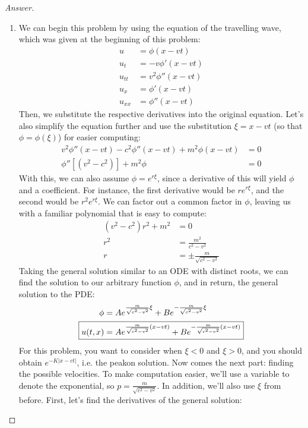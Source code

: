 \documentclass{article}
\theoremstyle{definition}
\renewcommand\qedsymbol{$\blacksquare$}
\newenvironment{ans}{\begin{proof}[Answer]\renewcommand{\qedsymbol}{}}{\end{proof}}
\begin{document}
\begin{ans}
\begin{enumerate}[start=38, resume*=answers]
    \item We can begin this problem by using the equation of the travelling wave, which was given at the beginning of this problem:
    \begin{align*}
        u &= \phi(x-vt)\\
        u_t &= -v\phi'(x-vt)\\
        u_{tt} &= v^2\phi''(x-vt)\\
        u_x &= \phi'(x-vt)\\
        u_{xx} &= \phi''(x-vt)
    \end{align*}
    Then, we substitute the respective derivatives into the original equation. Let's also simplify the equation further and use the substitution $\xi = x-vt$ (so that $\phi = \phi(\xi)$) for easier computing:
    \begin{align*}
        v^2\phi''(x-vt) - c^2\phi''(x-vt) + m^2\phi(x-vt)&=0\\
        \phi''[(v^2 - c^2)] + m^2\phi&=0
    \end{align*}
    With this, we can also assume $\phi = e^{r\xi}$, since a derivative of this will yield $\phi$ and a coefficient. For instance, the first derivative would be $re^{r\xi}$, and the second would be $r^2e^{r\xi}$. We can factor out a common factor in $\phi$, leaving us with a familiar polynomial that is easy to compute:
    \begin{align*}
        (v^2 - c^2)r^2 + m^2 &= 0\\
        r^2 &= \frac{m^2}{c^2 - v^2}\\
        r &= \pm \frac{m}{\sqrt{c^2-v^2}}
    \end{align*}
    Taking the general solution similar to an ODE with distinct roots, we can find the solution to our arbitrary function $\phi$, and in return, the general solution to the PDE:
    \begin{align*}
        \phi &= Ae^{\frac{m}{\sqrt{c^2 - v^2}}\xi} + Be^{-\frac{m}{\sqrt{c^2 - v^2}}\xi}\\
        \Aboxed{u(t,x) &= Ae^{\frac{m}{\sqrt{c^2 - v^2}}(x-vt)} + Be^{-\frac{m}{\sqrt{c^2 - v^2}}(x-vt)}}
    \end{align*}
    {\color{red} For this problem, you want to consider when $\xi<0$ and $\xi>0$, and you should obtain $e^{-K|x-ct|}$, i.e. the peakon solution. }
    Now comes the next part: finding the possible velocities. To make computation easier, we'll use a variable to denote the exponential, so $p = \frac{m}{\sqrt{c^2-v^2}}$. In addition, we'll also use $\xi$ from before. First, let's find the derivatives of the general solution:

\end{enumerate}
\end{ans}
\end{document}
